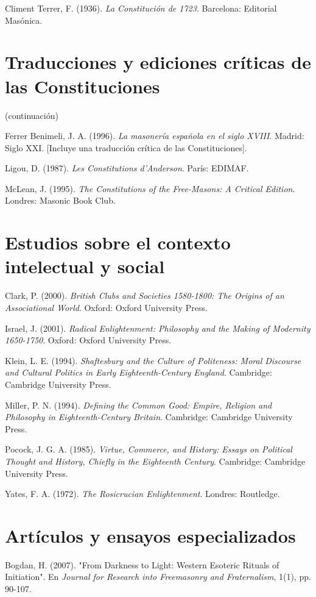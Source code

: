\documentclass[a4paper,12pt,twoside]{book}
\begin{document}
Climent Terrer, F. (1936). \textit{La Constitución de 1723}. Barcelona: Editorial Masónica.

\section*{Traducciones y ediciones críticas de las Constituciones} (continuación)

Ferrer Benimeli, J. A. (1996). \textit{La masonería española en el siglo XVIII}. Madrid: Siglo XXI. [Incluye una traducción crítica de las Constituciones].

Ligou, D. (1987). \textit{Les Constitutions d'Anderson}. París: EDIMAF.

McLean, J. (1995). \textit{The Constitutions of the Free-Masons: A Critical Edition}. Londres: Masonic Book Club.

\section*{Estudios sobre el contexto intelectual y social}

Clark, P. (2000). \textit{British Clubs and Societies 1580-1800: The Origins of an Associational World}. Oxford: Oxford University Press.

Israel, J. (2001). \textit{Radical Enlightenment: Philosophy and the Making of Modernity 1650-1750}. Oxford: Oxford University Press.

Klein, L. E. (1994). \textit{Shaftesbury and the Culture of Politeness: Moral Discourse and Cultural Politics in Early Eighteenth-Century England}. Cambridge: Cambridge University Press.

Miller, P. N. (1994). \textit{Defining the Common Good: Empire, Religion and Philosophy in Eighteenth-Century Britain}. Cambridge: Cambridge University Press.

Pocock, J. G. A. (1985). \textit{Virtue, Commerce, and History: Essays on Political Thought and History, Chiefly in the Eighteenth Century}. Cambridge: Cambridge University Press.

Yates, F. A. (1972). \textit{The Rosicrucian Enlightenment}. Londres: Routledge.

\section*{Artículos y ensayos especializados}

Bogdan, H. (2007). "From Darkness to Light: Western Esoteric Rituals of Initiation". En \textit{Journal for Research into Freemasonry and Fraternalism}, 1(1), pp. 90-107.
\end{document}
